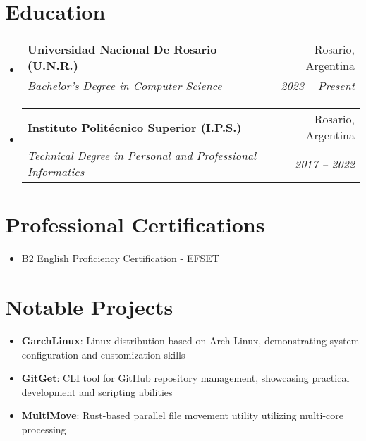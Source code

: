 \documentclass[letterpaper,11pt]{article}
\makeatletter
\newcommand{\resumeItem}[2]{
    \item\small{
        \textbf{#1}: #2
    }
}
\newcommand{\resumeSubheading}[4]{
    \vspace{4mm}\item
    \begin{tabular*}{0.97\textwidth}[t]{l@{\extracolsep{\fill}}r}
        \textbf{#1} & #2 \\
        \textit{#3} & \textit{#4} \\
    \end{tabular*}\vspace{4mm}
}
\newcommand{\achievementItem}[1]{
    \item\small{#1}
}
\makeatother
\begin{document}
\section{Education}
\begin{itemize}[leftmargin=*]
    \resumeSubheading
    {Universidad Nacional De Rosario (U.N.R.)}{Rosario, Argentina}
    {Bachelor's Degree in Computer Science}{2023 -- Present}

    \resumeSubheading
    {Instituto Politécnico Superior (I.P.S.)}{Rosario, Argentina}
    {Technical Degree in Personal and Professional Informatics}{2017 -- 2022}
\end{itemize}

\section{Professional Certifications}
\begin{itemize}[leftmargin=*]
    \achievementItem{B2 English Proficiency Certification - EFSET}
\end{itemize}

\section{Notable Projects}
\begin{itemize}[leftmargin=*]
    \resumeItem{GarchLinux}{Linux distribution based on Arch Linux, demonstrating system configuration and customization skills}
    \resumeItem{GitGet}{CLI tool for GitHub repository management, showcasing practical development and scripting abilities}
    \resumeItem{MultiMove}{Rust-based parallel file movement utility utilizing multi-core processing}
\end{itemize}
\end{document}
